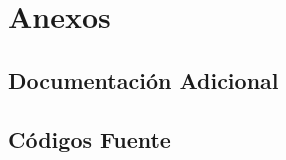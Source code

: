 \documentclass[11pt,a4paper]{article}
\begin{document}
\appendix \section{Anexos} \subsection{Documentación Adicional} \subsection{Códigos Fuente}

 
\end{document}
